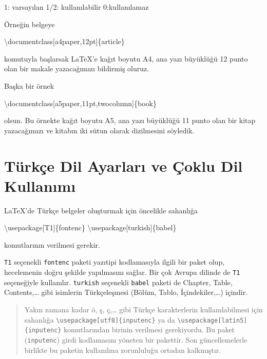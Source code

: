\documentclass[
  10pt,
]{scrbook}
\newenvironment{Shaded}{\begin{snugshade}}{\end{snugshade}}
\newcommand{\NormalTok}[1]{#1}
\begin{document}
1: varsayılan 1/2: kullanılabilir 0:kullanılamaz

Örneğin belgeye

\begin{Shaded}
\begin{Highlighting}[]
\NormalTok{\textbackslash{}documentclass[a4paper,12pt]\{article\}}
\end{Highlighting}
\end{Shaded}

komutuyla başlarsak LaTeX'e kağıt boyutu A4, ana yazı büyüklüğü 12 punto
olan bir makale yazacağımızı bildirmiş oluruz.

Başka bir örnek

\begin{Shaded}
\begin{Highlighting}[]
\NormalTok{\textbackslash{}documentclass[a5paper,11pt,twocolumn]\{book\}}
\end{Highlighting}
\end{Shaded}

olsun. Bu örnekte kağıt boyutu A5, ana yazı büyüklüğü 11 punto olan bir
kitap yazacağımızı ve kitabın iki sütun olarak dizilmesini söyledik.

\hypertarget{turkce}{%
\section{Türkçe Dil Ayarları ve Çoklu Dil Kullanımı}\label{turkce}}

LaTeX'de Türkçe belgeler oluşturmak için öncelikle sahanlığa

\begin{Shaded}
\begin{Highlighting}[]
\NormalTok{\textbackslash{}usepackage[T1]\{fontenc\}}
\NormalTok{\textbackslash{}usepackage[turkish]\{babel\}}
\end{Highlighting}
\end{Shaded}

komutlarının verilmesi gerekir.

\texttt{T1} seçenekli \texttt{fontenc} paketi yazıtipi kodlamasıyla ilgili bir paket
olup, hecelemenin doğru şekilde yapılmasını sağlar. Bir çok Avrupa
dilinde de \texttt{T1} seçeneğiyle kullanılır. \texttt{turkish} seçenekli \texttt{babel}
paketi de Chapter, Table, Contents,\ldots{} gibi isimlerin Türkçeleşmesi
(Bölüm, Tablo, İçindekiler,\ldots) içindir.

\begin{quote}
Yakın zamana kadar ö, ş, ç,\ldots{} gibi Türkçe karakterlerin
kullanılabilmesi için sahanlığa \texttt{\textbackslash{}usepackage{[}utf8{]}\{inputenc\}} ya da
\texttt{\textbackslash{}usepackage{[}latin5{]}\{inputenc\}} komutlarından birinin verilmesi
gerekiyordu. Bu paket (\texttt{inputenc}) girdi kodlamasını yöneten bir
pakettir. Son güncellemelerle birlikte bu paketin kullanılma
zorunluluğu ortadan kalkmıştır.
\end{quote}
\end{document}
